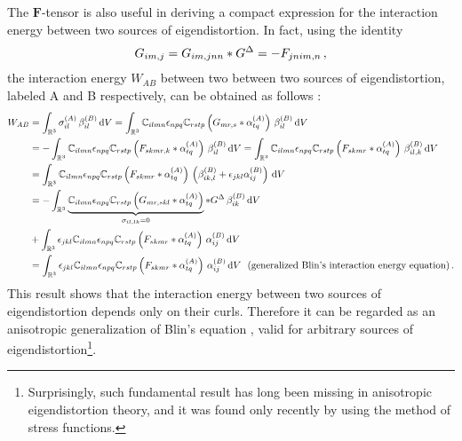 The $\bm F$-tensor is also useful in deriving a compact expression for the
interaction energy between two sources of eigendistortion. In fact, using the identity
\begin{align}
G_{im,j}=G_{im,jnn}*G^\Delta=-F_{jnim,n}\,,
\end{align}
the interaction energy $W_{AB}$ between two between two sources of eigendistortion, labeled A and B respectively, can be obtained as follows \citep{po2018non}:
 \begin{align} 
 W_{AB}&
= \int_{\mathbb{R}^3}\sigma^{(A)}_{il}\, \beta^{(B)}_{il}\dV%
= \int_{\mathbb{R}^3}\mathbb{C}_{ilmn}\epsilon_{npq}\mathbb{C}_{rstp}\left(G_{mr,s}*\alpha^{(A)}_{tq}\right)\, \beta^{(B)}_{il}\dV\nonumber\\
&=- \int_{\mathbb{R}^3}\mathbb{C}_{ilmn}\epsilon_{npq}\mathbb{C}_{rstp}\left(F_{skmr,k}*\alpha^{(A)}_{tq}\right)\, \beta^{(B)}_{il}\dV
= \int_{\mathbb{R}^3}\mathbb{C}_{ilmn}\epsilon_{npq}\mathbb{C}_{rstp}\left(F_{skmr}*\alpha^{(A)}_{tq}\right)\, \beta^{(B)}_{il,k}\dV\nonumber\\
&= \int_{\mathbb{R}^3}\mathbb{C}_{ilmn}\epsilon_{npq}\mathbb{C}_{rstp}\left(F_{skmr}*\alpha^{(A)}_{tq}\right)\, \left(\beta^{(B)}_{ik,l}+\epsilon_{jkl}\alpha^{(B)}_{ij}\right) \dV\nonumber\\
&= -\int_{\mathbb{R}^3}\underbrace{\mathbb{C}_{ilmn}\epsilon_{npq}\mathbb{C}_{rstp}\left(G_{mr,skl}*\alpha^{(A)}_{tq}\right)}_{\sigma_{il,lk}=0}*\GP\, \beta^{(B)}_{ik} \dV\nonumber\\
&+\int_{\mathbb{R}^3}\epsilon_{jkl}\mathbb{C}_{ilmn}\epsilon_{npq}\mathbb{C}_{rstp}\left(F_{skmr}*\alpha^{(A)}_{tq}\right)\, \alpha^{(B)}_{ij} \dV\nonumber\\
 &=\int_{\mathbb{R}^3}\epsilon_{jkl}\mathbb{C}_{ilmn}\epsilon_{npq}\mathbb{C}_{rstp}\left(F_{skmr}*\alpha^{(A)}_{tq}\right)\, \alpha^{(B)}_{ij} \dV\,\,\,\,  (\text{generalized Blin's interaction energy equation})\,.
 \end{align}
 This result shows that the interaction energy between two sources of eigendistortion depends only on their curls. Therefore it can be regarded as an anisotropic generalization of Blin's equation \citep{Blin:1955wh}, valid for arbitrary sources of eigendistortion\footnote{Surprisingly, such fundamental result has long been missing in anisotropic eigendistortion theory, and it was   found only recently by \cite{Lazar:2013jb} using the method of stress functions.}.



